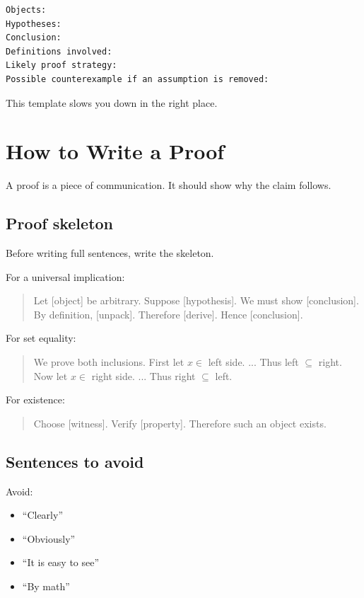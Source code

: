 \documentclass[11pt]{article}
\begin{document}
\begin{verbatim}
Objects:
Hypotheses:
Conclusion:
Definitions involved:
Likely proof strategy:
Possible counterexample if an assumption is removed:
\end{verbatim}

This template slows you down in the right place.

\newpage
\section{How to Write a Proof}

A proof is a piece of communication. It should show why the claim follows.

\subsection{Proof skeleton}

Before writing full sentences, write the skeleton.

For a universal implication:

\begin{quote}
Let [object] be arbitrary. Suppose [hypothesis]. We must show [conclusion]. By definition, [unpack]. Therefore [derive]. Hence [conclusion].
\end{quote}

For set equality:

\begin{quote}
We prove both inclusions. First let $x\in$ left side. ... Thus left $\subseteq$ right. Now let $x\in$ right side. ... Thus right $\subseteq$ left.
\end{quote}

For existence:

\begin{quote}
Choose [witness]. Verify [property]. Therefore such an object exists.
\end{quote}

\subsection{Sentences to avoid}

Avoid:

\begin{itemize}
\item ``Clearly''
\item ``Obviously''
\item ``It is easy to see''
\item ``By math''
\end{itemize}
\end{document}
